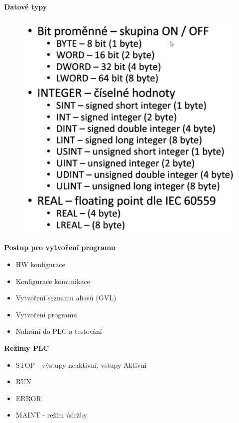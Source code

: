 \begin{itemize}
\textbf{Datové typy}
\begin{figure}[h]
  \begin{center}
    \includegraphics[scale = 1]{img/Picture16.png}
  \end{center}
\end{figure}

\textbf{Postup pro vytvoření programu}
\begin{itemize}
  \item HW konfigurace 
  \item Konfigurace komunikace
  \item Vytvoření seznamu aliasů (GVL)
  \item Vytvoření programu
  \item Nahrání do PLC a testování
\end{itemize}

\textbf{Režimy PLC}
\begin{itemize}
  \item STOP - výstupy neaktivní, vstupy Aktivní
  \item RUN 
  \item ERROR 
  \item MAINT - režim údržby
\end{itemize}


\end{itemize}
